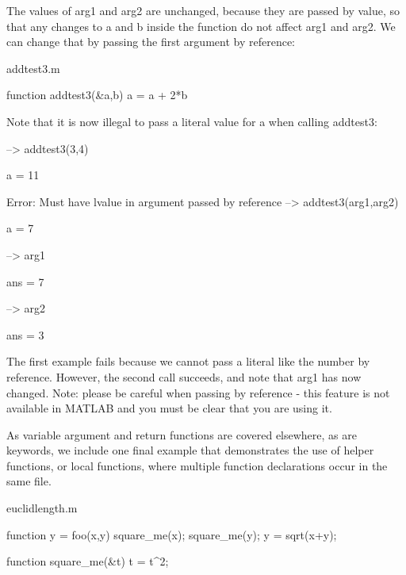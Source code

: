 The values of {\ttfamily arg1} and {\ttfamily arg2} are unchanged, because they are passed by value, so that any changes to {\ttfamily a} and {\ttfamily b} inside the function do not affect {\ttfamily arg1} and {\ttfamily arg2}. We can change that by passing the first argument by reference\-:

\begin{DoxyVerb}     addtest3.m
\end{DoxyVerb}



\begin{DoxyVerbInclude}
function addtest3(&a,b)
  a = a + 2*b
\end{DoxyVerbInclude}


Note that it is now illegal to pass a literal value for {\ttfamily a} when calling {\ttfamily addtest3}\-:


\begin{DoxyVerbInclude}
--> addtest3(3,4)

a = 
 11 

Error: Must have lvalue in argument passed by reference
--> addtest3(arg1,arg2)

a = 
 7 

--> arg1

ans = 
 7 

--> arg2

ans = 
 3 
\end{DoxyVerbInclude}


The first example fails because we cannot pass a literal like the number {} by reference. However, the second call succeeds, and note that {\ttfamily arg1} has now changed. Note\-: please be careful when passing by reference -\/ this feature is not available in M\-A\-T\-L\-A\-B and you must be clear that you are using it.

As variable argument and return functions are covered elsewhere, as are keywords, we include one final example that demonstrates the use of helper functions, or local functions, where multiple function declarations occur in the same file.

\begin{DoxyVerb}     euclidlength.m
\end{DoxyVerb}



\begin{DoxyVerbInclude}
function y = foo(x,y)
  square_me(x);
  square_me(y);
  y = sqrt(x+y);

function square_me(&t)
  t = t^2;
\end{DoxyVerbInclude}



